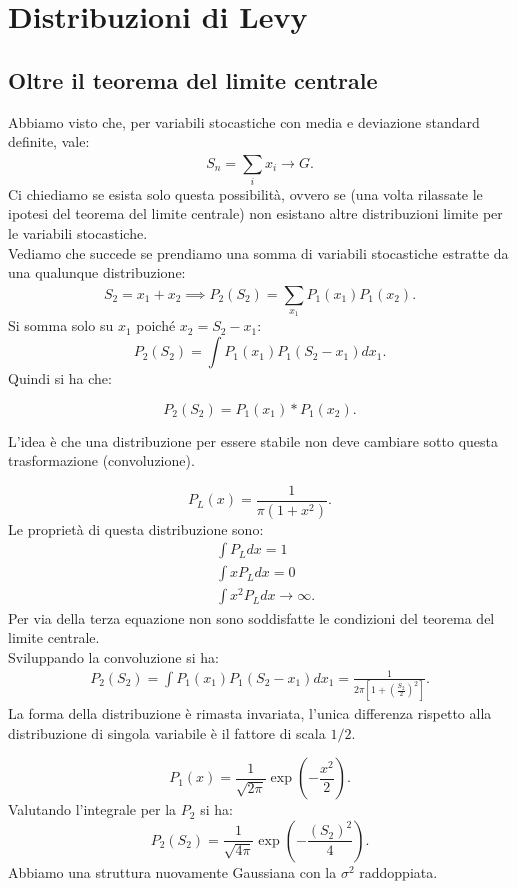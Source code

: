 \section{Distribuzioni di Levy}%
\label{sub:Lezione 9}
\mylocaltoc
\subsection{Oltre il teorema del limite centrale}%
\label{sub:Distribuzioni fisiche che non rispettano il teorema del limite centrale}
Abbiamo visto che, per variabili stocastiche con media e deviazione standard definite, vale:
\[
    S_n = \sum_{i}^{} x_i \to G
.\] 
Ci chiediamo se esista solo questa possibilità, ovvero se (una volta rilassate le ipotesi del teorema del limite centrale) non esistano altre distribuzioni limite per le variabili stocastiche.\\
Vediamo che succede se prendiamo una somma di variabili stocastiche estratte da una qualunque distribuzione:
\[
    S_2 = x_1 + x_2 \implies P_2(S_2) = \sum_{x_1}^{} P_1(x_1) P_1(x_2) 
.\] 
Si somma solo su $x_1$ poiché $x_2 = S_2-x_1$:
\[
    P_2(S_2) = \int P_1(x_1) P_1(S_2-x_1) dx_1
.\] 
Quindi si ha che:
\begin{redbox}{}
    \[
	P_2(S_2) = P_1(x_1) * P_1(x_2) 
    .\] 
\end{redbox}
\noindent
L'idea è che una distribuzione per essere stabile non deve cambiare sotto questa trasformazione (convoluzione).
\begin{exmp}
\[
    P_L(x) = \frac{1}{\pi\left(1+x^2\right)}
.\] 
Le proprietà di questa distribuzione sono:
\[\begin{aligned}
    &\int P_L dx = 1\\
    & \int xP_L dx = 0\\
    & \int  x^2P_L dx \to \infty
.\end{aligned}\]
Per via della terza equazione non sono soddisfatte le condizioni del teorema del limite centrale.\\
Sviluppando la convoluzione si ha:
\[\begin{aligned}
    P_2(S_2) = \int P_1(x_1) P_1(S_2-x_1) dx_1 = \frac{1}{2\pi\left[1 + \left(\frac{S_2}{2}\right)^2\right]}
.\end{aligned}\]
La forma della distribuzione è rimasta invariata, l'unica differenza rispetto alla distribuzione di singola variabile è il fattore di scala $1 /2$.
\end{exmp}
\noindent
\begin{exmp}[Gaussiana]
\[
    P_1(x) = \frac{1}{\sqrt{2\pi}}\exp\left(-\frac{x^2}{2}\right)
.\]  
Valutando l'integrale per la $P_2$ si ha:
\[
    P_2(S_2) =\frac{1}{\sqrt{4\pi}}\exp\left(-\frac{(S_2)^2}{4}\right) 
.\] 
Abbiamo una struttura nuovamente Gaussiana con la $\sigma^2$ raddoppiata.
\end{exmp}
